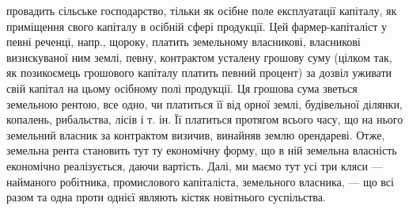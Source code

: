 провадить сільське господарство, тільки як осібне поле експлуатації капіталу, як
приміщення свого капіталу в осібній сфері продукції. Цей фармер-капіталіст у
певні реченці, напр., щороку, платить земельному власникові, власникові визискуваної
ним землі, певну, контрактом усталену грошову суму (цілком так, як позикоємець
грошового капіталу платить певний процент) за дозвіл уживати свій капітал
на цьому осібному полі продукції. Ця грошова сума зветься земельною рентою,
все одно, чи платиться її від орної землі, будівельної ділянки, копалень, рибальства,
лісів і т. ін. Її платиться протягом всього часу, що на нього земельний
власник за контрактом визичив, винайняв землю орендареві. Отже, земельна
рента становить тут ту економічну форму, що в ній земельна власність економічно
реалізується, даючи вартість. Далі, ми маємо тут усі три кляси — найманого
робітника, промислового капіталіста, земельного власника, — що всі разом
та одна проти однієї являють кістяк новітнього суспільства.

